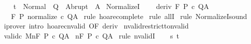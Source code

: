 \begin{isabellebody}
\ \ \isamarkupfalse%
\ {\isachardoublequoteopen}t\ {\isasymin}\ Normal\ {\isacharbackquote}\ Q\ {\isasymunion}\ Abrupt\ {\isacharbackquote}\ A{\isachardoublequoteclose}\isacommand{{\isachardot}}\isamarkupfalse%
\isanewline
{}\isamarkupfalse%
%
\endisatagproof
{\isafoldproof}%
%
\isadelimproof
\isanewline
%
\endisadelimproof
\isanewline
{}\isamarkupfalse%
\ NormalizeI{\isacharcolon}\ \isanewline
\ \ \ deriv{\isacharcolon}\ {\isachardoublequoteopen}{\isasymGamma}{\isacharcomma}{\isasymTheta}{\isasymturnstile}\isactrlbsub {\isacharslash}F\isactrlesub \ P\ c\ Q{\isacharcomma}A{\isachardoublequoteclose}\isanewline
\ \ \ {\isachardoublequoteopen}{\isasymGamma}{\isacharcomma}{\isasymTheta}{\isasymturnstile}\isactrlbsub {\isacharslash}F\isactrlesub \ P\ {\isacharparenleft}normalize\ c{\isacharparenright}\ Q{\isacharcomma}A{\isachardoublequoteclose}\isanewline
%
\isadelimproof
%
\endisadelimproof
%
\isatagproof
{}\isamarkupfalse%
\ {\isacharparenleft}rule\ hoare{\isacharunderscore}complete{\isacharprime}{\isacharparenright}\isanewline
{}\isamarkupfalse%
\ {\isacharparenleft}rule\ allI{\isacharparenright}\isanewline
{}\isamarkupfalse%
\ {\isacharparenleft}rule\ NormalizeI{\isacharunderscore}sound{\isacharparenright}\isanewline
{}\isamarkupfalse%
\ {\isacharparenleft}iprover\ intro{\isacharcolon}\ hoare{\isacharunderscore}cnvalid\ {\isacharbrackleft}OF\ deriv{\isacharbrackright}{\isacharparenright}\isanewline
{}\isamarkupfalse%
%
\endisatagproof
{\isafoldproof}%
%
\isadelimproof
%
\endisadelimproof
%
\isamarkuptrue%
\isamarkupfalse%
\ nvalid{\isacharunderscore}restrict{\isacharunderscore}to{\isacharunderscore}nvalid{\isacharcolon}\isanewline
{}\ valid{\isacharunderscore}c{\isacharcolon}\ {\isachardoublequoteopen}{\isasymGamma}{\isacharbar}\isactrlbsub M\isactrlesub {\isasymTurnstile}n{\isacharcolon}\isactrlbsub {\isacharslash}F\isactrlesub \ P\ c\ Q{\isacharcomma}A{\isachardoublequoteclose}\isanewline
{}\ {\isachardoublequoteopen}{\isasymGamma}{\isasymTurnstile}n{\isacharcolon}\isactrlbsub {\isacharslash}F\isactrlesub \ P\ c\ Q{\isacharcomma}A{\isachardoublequoteclose}\isanewline
%
\isadelimproof
%
\endisadelimproof
%
\isatagproof
{}\isamarkupfalse%
\ {\isacharparenleft}rule\ nvalidI{\isacharparenright}\isanewline
\ \ \isamarkupfalse%
\ s\ t\isanewline
\ \ \isamarkupfalse%

\end{isabellebody}
